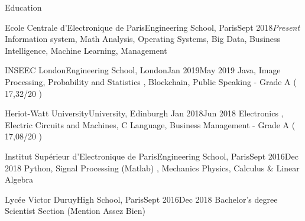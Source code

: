 \documentclass{resume}
\begin{document}
	\begin{rSection}{Education}
		\begin{school}{Ecole Centrale d'Electronique de Paris}{Engineering School, Paris}{Sept 2018}{\em Present}{
			Information system, Math Analysis, Operating Systems, Big Data, Business Intelligence, Machine Learning, Management 
		}
		\end{school}

		\begin{school}{INSEEC London}{Engineering School, London}{Jan 2019}{May 2019}{
			Java, Image Processing, Probability and Statistics , Blockchain, Public Speaking - Grade A ( 17,32/20 )
		}
		\end{school}
		
		\begin{school}{Heriot-Watt University}{University, Edinburgh }{Jan 2018}{Jun 2018}{
			Electronics , Electric Circuits and Machines, C Language, Business Management - Grade A ( 17,08/20 )
		}
		\end{school}

		\begin{school}{Institut Supérieur d'Electronique de Paris}{Engineering School, Paris}{Sept 2016}{Dec 2018}{
			Python, Signal Processing (Matlab) , Mechanics Physics, Calculus \& Linear Algebra
		}
		\end{school}
		\begin{school}{Lycée Victor Duruy}{High School, Paris}{Sept 2016}{Dec 2018}{
			Bachelor's degree Scientist Section (Mention Assez Bien)
		}
		\end{school}
	\end{rSection}
\end{document}
